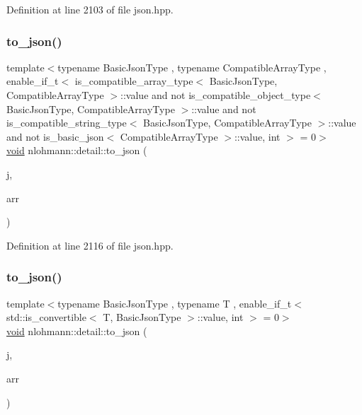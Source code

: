 Definition at line 2103 of file json.\+hpp.

\mbox{\label{namespacenlohmann_1_1detail_a3afebc132c5ff83f9cd160e52030fdfd}} 
\subsubsection{\texorpdfstring{to\_json()}{to\_json()}\hspace{0.1cm}{\footnotesize\ttfamily [9/17]}}
{\footnotesize\ttfamily template$<$typename Basic\+Json\+Type , typename Compatible\+Array\+Type , enable\+\_\+if\+\_\+t$<$ is\+\_\+compatible\+\_\+array\+\_\+type$<$ Basic\+Json\+Type, Compatible\+Array\+Type $>$\+::value and not is\+\_\+compatible\+\_\+object\+\_\+type$<$ Basic\+Json\+Type, Compatible\+Array\+Type $>$\+::value and not is\+\_\+compatible\+\_\+string\+\_\+type$<$ Basic\+Json\+Type, Compatible\+Array\+Type $>$\+::value and not is\+\_\+basic\+\_\+json$<$ Compatible\+Array\+Type $>$\+::value, int $>$  = 0$>$ \\
\mbox{\hyperlink{namespacenlohmann_1_1detail_a59fca69799f6b9e366710cb9043aa77d}{void}} nlohmann\+::detail\+::to\+\_\+json (\begin{DoxyParamCaption}\item[{Basic\+Json\+Type \&}]{j,  }\item[{const Compatible\+Array\+Type \&}]{arr }\end{DoxyParamCaption})}



Definition at line 2116 of file json.\+hpp.

\mbox{\label{namespacenlohmann_1_1detail_a7f7c7b9760161b774cdc0b4b838fae64}} 
\subsubsection{\texorpdfstring{to\_json()}{to\_json()}\hspace{0.1cm}{\footnotesize\ttfamily [10/17]}}
{\footnotesize\ttfamily template$<$typename Basic\+Json\+Type , typename T , enable\+\_\+if\+\_\+t$<$ std\+::is\+\_\+convertible$<$ T, Basic\+Json\+Type $>$\+::value, int $>$  = 0$>$ \\
\mbox{\hyperlink{namespacenlohmann_1_1detail_a59fca69799f6b9e366710cb9043aa77d}{void}} nlohmann\+::detail\+::to\+\_\+json (\begin{DoxyParamCaption}\item[{Basic\+Json\+Type \&}]{j,  }\item[{const std\+::valarray$<$ T $>$ \&}]{arr }\end{DoxyParamCaption})}



